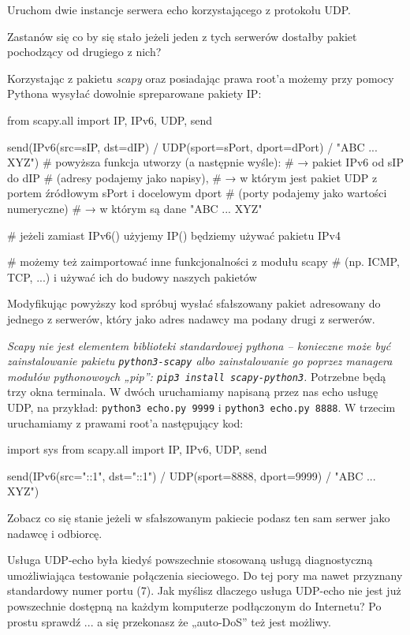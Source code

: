 \dbEntryCheckResults
Uruchom dwie instancje serwera echo korzystającego z protokołu UDP.

Zastanów się co by się stało jeżeli jeden z tych serwerów dostałby pakiet pochodzący od drugiego z nich?

Korzystając z pakietu \textit{scapy} oraz posiadając prawa root'a możemy przy pomocy Pythona wysyłać dowolnie spreparowane pakiety IP:

\begin{CodeFrame*}[python]{}
from scapy.all import IP, IPv6, UDP, send

send(IPv6(src=sIP, dst=dIP) / UDP(sport=sPort, dport=dPort) / "ABC ... XYZ")
# powyższa funkcja utworzy (a następnie wyśle):
#  → pakiet IPv6 od sIP do dIP
#    (adresy podajemy jako napisy),
#  → w którym jest pakiet UDP z portem źródłowym sPort i docelowym dport
#    (porty podajemy jako wartości numeryczne)
#  → w którym są dane "ABC ... XYZ"

# jeżeli zamiast IPv6() użyjemy IP() będziemy używać pakietu IPv4

# możemy też zaimportować inne funkcjonalności z modułu scapy
# (np. ICMP, TCP, ...) i używać ich do budowy naszych pakietów
\end{CodeFrame*}

Modyfikując powyższy kod spróbuj wysłać sfałszowany pakiet adresowany do jednego z serwerów, który jako adres nadawcy ma podany drugi z serwerów.

\textit{Scapy nie jest elementem biblioteki standardowej pythona – konieczne może być zainstalowanie pakietu \texttt{python3-scapy} albo zainstalowanie go poprzez managera modułów pythonowoych „pip”: \texttt{pip3 install scapy-python3}.}
\fi
{}\dbEntryCheckResults
Potrzebne będą trzy okna terminala. W dwóch uruchamiamy napisaną przez nas echo usługę UDP, na przykład: \Verb#python3 echo.py 9999# i \Verb#python3 echo.py 8888#.
W trzecim uruchamiamy z prawami root'a następujący kod:

\begin{CodeFrame*}[python]{}
import sys
from scapy.all import IP, IPv6, UDP, send

send(IPv6(src="::1", dst="::1") / UDP(sport=8888, dport=9999) / "ABC ... XYZ")
\end{CodeFrame*}
\fi

\dbEntryCheckResults
Zobacz co się stanie jeżeli w sfałszowanym pakiecie podasz ten sam serwer jako nadawcę i odbiorcę.

Usługa UDP-echo była kiedyś powszechnie stosowaną usługą diagnostyczną umożliwiająca testowanie połączenia sieciowego. Do tej pory ma nawet przyznany standardowy numer portu (7).
Jak myślisz dlaczego usługa UDP-echo nie jest już powszechnie dostępną na każdym komputerze podłączonym do Internetu?
\fi
{}\dbEntryCheckResults
Po prostu sprawdź ... a się przekonasz że „auto-DoS” też jest możliwy.
\fi
